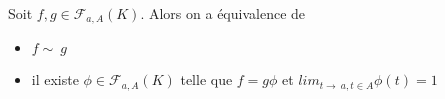 






\begin{example}[Remarque]
  Soit $f,g \in\mathcal{F}_{a,A}(K)$. Alors on a équivalence de

\begin{itemize}
\item
   $f \sim\  g$
\item
   il existe $\phi \in\mathcal{F}_{a,A}(K)$ telle que $f = g\phi$ et
  $lim_{t\rightarrow~a,t \in A} \phi(t) = 1$
  \end{itemize}

\end{example}


